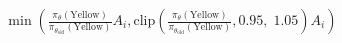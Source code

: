 \documentclass[preview]{standalone}
\begin{document}
\begin{align*}
\min \left(\frac{\pi_\theta(\text{Yellow})}{\pi_{\theta_{\text{old}}}(\text{Yellow})} A_i, \text{clip} \left( \frac{\pi_\theta(\text{Yellow})}{\pi_{\theta_{\text{old}}}(\text{Yellow})}, 0.95,\; 1.05 \right) A_i \right)
\end{align*}
\end{document}
